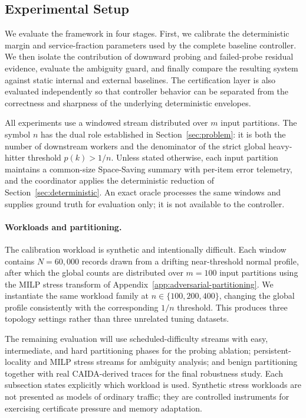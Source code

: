 \documentclass[sigconf, nonacm]{acmart}
\begin{document}
\subsection{Experimental Setup}
\label{subsec:exp-setup}
We evaluate the framework in four stages. First, we calibrate the deterministic margin and service-fraction parameters used by the complete baseline controller. We then isolate the contribution of downward probing and failed-probe residual evidence, evaluate the ambiguity guard, and finally compare the resulting system against static internal and external baselines. The certification layer is also evaluated independently so that controller behavior can be separated from the correctness and sharpness of the underlying deterministic envelopes.

All experiments use a windowed stream distributed over \(m\) input partitions. The symbol \(n\) has the dual role established in Section~\ref{sec:problem}: it is both the number of downstream workers and the denominator of the strict global heavy-hitter threshold \(p(k)>1/n\). Unless stated otherwise, each input partition maintains a common-size Space-Saving summary with per-item error telemetry, and the coordinator applies the deterministic reduction of Section~\ref{sec:deterministic}. An exact oracle processes the same windows and supplies ground truth for evaluation only; it is not available to the controller.

\paragraph{Workloads and partitioning.}
The calibration workload is synthetic and intentionally difficult. Each window contains \(N=60{,}000\) records drawn from a drifting near-threshold normal profile, after which the global counts are distributed over \(m=100\) input partitions using the MILP stress transform of Appendix~\ref{app:adversarial-partitioning}. We instantiate the same workload family at \(n\in\{100,200,400\}\), changing the global profile consistently with the corresponding \(1/n\) threshold. This produces three topology settings rather than three unrelated tuning datasets.

The remaining evaluation will use scheduled-difficulty streams with easy, intermediate, and hard partitioning phases for the probing ablation; persistent-locality and MILP stress streams for ambiguity analysis; and benign partitioning together with real CAIDA-derived traces for the final robustness study. Each subsection states explicitly which workload is used. Synthetic stress workloads are not presented as models of ordinary traffic; they are controlled instruments for exercising certificate pressure and memory adaptation.
\end{document}
